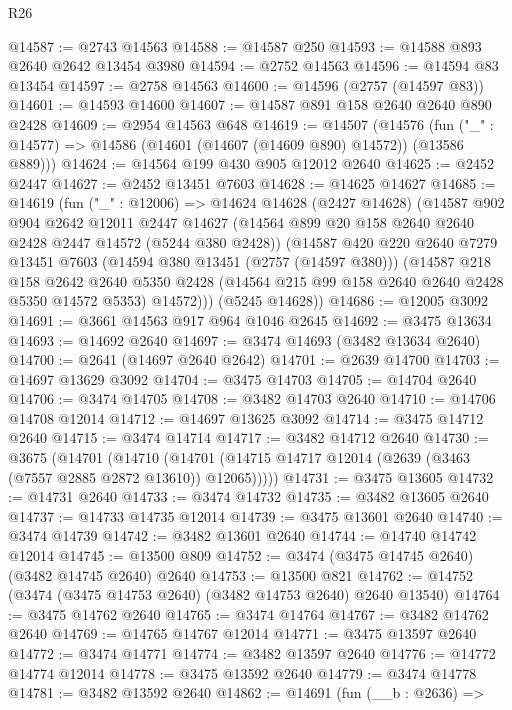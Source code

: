 \begin{lexlean}{R26}
\begin{coremodule}
@14587 := @2743 @14563
@14588 := @14587 @250
@14593 := @14588 @893 @2640 @2642 @13454 @3980
@14594 := @2752 @14563
@14596 := @14594 @83 @13454
@14597 := @2758 @14563
@14600 := @14596 (@2757 (@14597 @83))
@14601 := @14593 @14600
@14607 := @14587 @891 @158 @2640 @2640 @890 @2428
@14609 := @2954 @14563 @648
@14619 := @14507
    (@14576 (fun ("_" : @14577) => @14586 (@14601 (@14607 (@14609 @890) @14572)) (@13586 @889)))
@14624 := @14564 @199 @430 @905 @12012 @2640
@14625 := @2452 @2447
@14627 := @2452 @13451 @7603
@14628 := @14625 @14627
@14685 := @14619
    (fun ("_" : @12006) =>
    @14624
      @14628
      (@2427 @14628)
      (@14587
        @902
        @904
        @2642
        @12011
        @2447
        @14627
        (@14564 @899 @20 @158 @2640 @2640 @2428 @2447 @14572 (@5244 @380 @2428))
        (@14587
          @420
          @220
          @2640
          @7279
          @13451
          @7603
          (@14594 @380 @13451 (@2757 (@14597 @380)))
          (@14587
            @218
            @158
            @2642
            @2640
            @5350
            @2428
            (@14564 @215 @99 @158 @2640 @2640 @2428 @5350 @14572 @5353)
            @14572)))
      (@5245 @14628))
@14686 := @12005 @3092
@14691 := @3661 @14563 @917 @964 @1046 @2645
@14692 := @3475 @13634
@14693 := @14692 @2640
@14697 := @3474 @14693 (@3482 @13634 @2640)
@14700 := @2641 (@14697 @2640 @2642)
@14701 := @2639 @14700
@14703 := @14697 @13629 @3092
@14704 := @3475 @14703
@14705 := @14704 @2640
@14706 := @3474 @14705
@14708 := @3482 @14703 @2640
@14710 := @14706 @14708 @12014
@14712 := @14697 @13625 @3092
@14714 := @3475 @14712 @2640
@14715 := @3474 @14714
@14717 := @3482 @14712 @2640
@14730 := @3675
    (@14701
      (@14710 (@14701 (@14715 @14717 @12014 (@2639 (@3463 (@7557 @2885 @2872 @13610)) @12065)))))
@14731 := @3475 @13605
@14732 := @14731 @2640
@14733 := @3474 @14732
@14735 := @3482 @13605 @2640
@14737 := @14733 @14735 @12014
@14739 := @3475 @13601 @2640
@14740 := @3474 @14739
@14742 := @3482 @13601 @2640
@14744 := @14740 @14742 @12014
@14745 := @13500 @809
@14752 := @3474 (@3475 @14745 @2640) (@3482 @14745 @2640) @2640
@14753 := @13500 @821
@14762 := @14752 (@3474 (@3475 @14753 @2640) (@3482 @14753 @2640) @2640 @13540)
@14764 := @3475 @14762 @2640
@14765 := @3474 @14764
@14767 := @3482 @14762 @2640
@14769 := @14765 @14767 @12014
@14771 := @3475 @13597 @2640
@14772 := @3474 @14771
@14774 := @3482 @13597 @2640
@14776 := @14772 @14774 @12014
@14778 := @3475 @13592 @2640
@14779 := @3474 @14778
@14781 := @3482 @13592 @2640
@14862 := @14691
    (fun (__b : @2636) =>

\end{coremodule}
\end{lexlean}
